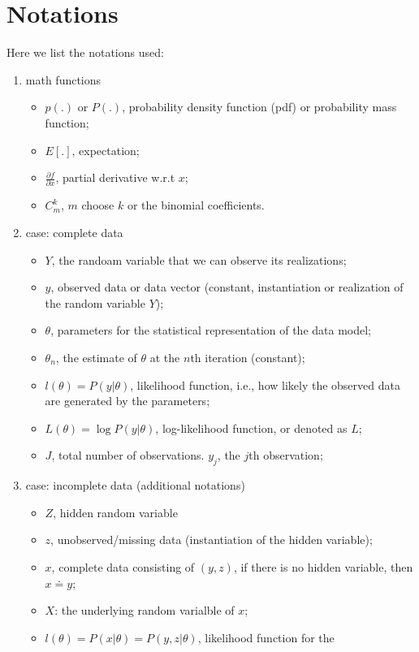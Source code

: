 \documentclass{article}  %
\begin{document}
\section{Notations} 
Here we list the notations used:
\begin{enumerate}
  \item math functions
  \begin{itemize}
    \item $p(.)$ or $P(.)$, probability density function (pdf) or probability
    mass function;
    \item $E[.]$, expectation;
    \item $\frac{\partial f}{\partial x}$, partial derivative w.r.t $x$;
    \item $C_m^k$, $m$ choose $k$ or the binomial coefficients.
  \end{itemize}
  \item case: complete data
  \begin{itemize}
  \item $Y$, the randoam variable that we can observe its realizations;
  \item $y$, observed data or data vector (constant, instantiation or
  realization of the random variable $Y$);
  \item $\theta$, parameters for the statistical representation of the data model;
  \item $\theta_n$, the estimate of $\theta$ at the $n$th iteration (constant);
  \item $l(\theta)=P(y|\theta)$, likelihood function, i.e., how likely the
  observed data are generated by the parameters;
  \item $L(\theta) = \log P(y|\theta)$, log-likelihood function, or denoted as
  $L$;
  \item $J$, total number of observations. $y_j$, the $j$th observation;
  \end{itemize}
  \item case: incomplete data (additional notations)
  \begin{itemize}
  \item $Z$, hidden random variable
  \item $z$, unobserved/missing data (instantiation of the hidden
  variable);
  \item $x$, complete data consisting of $(y,z)$, if there is no hidden
  variable, then $x\doteq  y$;  
  \item $X$: the underlying random varialble of $x$;
  \item $l(\theta)=P(x|\theta)=P(y,z|\theta)$, likelihood function for the

\end{itemize}
\end{enumerate}
\end{document}
